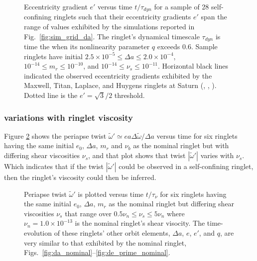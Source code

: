 \documentclass[preprint]{aastex62}
\begin{document}
\begin{figure}
    \caption{
        \label{fig:e_prime_q_vs_time}
        Eccentricity gradient $e'$ versus time $t/\tau_{dyn}$ for a sample of 28 self-confining
        ringlets such that their eccentricity gradients $e'$ span the range of values
        exhibited by the simulations reported in Fig.\ \ref{fig:sim_grid_da}. 
        The ringlet's dynamical timescale $\tau_{dyn}$ is time the when its nonlinearity parameter $q$ exceeds $0.6$.
        Sample ringlets have initial $2.5\times10^{-5}\le\Delta a\le2.0\times10^{-4}$,
        $10^{-14}\le m_r\le10^{-10}$, and $10^{-14}\le \nu_s\le10^{-11}$.
        Horizontal black lines indicated the observed eccentricity gradients 
        exhibited by the Maxwell, Titan, Laplace, and Huygens ringlets at Saturn 
        (\citealt{Netal14}, \citealt{Fetal16}, \citealt{SH16}). Dotted line is the $e'=\sqrt{3}/2$ threshold.
    }
\end{figure}


\subsubsection{variations with ringlet viscosity}
\label{subsec:viscosity-variations}

Figure \ref{fig:wt_prime_vs_time} shows the periapse twist $\tilde{\omega}' \simeq ea\Delta\tilde{\omega}/\Delta a$ 
versus time for six ringlets
having the same initial $e_0$, $\Delta a$, $m_r$ and $\nu_b$ as the nominal ringlet but with differing shear
viscosities $\nu_s$, and that plot shows that twist $|\tilde{\omega}'|$ varies with $\nu_s$. Which indicates that if 
the twist $|\tilde{\omega}'|$ could be observed in a self-confining ringlet, then 
the ringlet's viscosity could then be inferred. 

\begin{figure}
    \caption{
        \label{fig:wt_prime_vs_time}
        Periapse twist $\tilde{\omega}'$ is plotted versus time $t/\tau_\nu$ for six ringlets
        having the same initial $e_0$, $\Delta a$, $m_r$ as the nominal ringlet
        but differing shear viscosities $\nu_s$ that range over $0.5\nu_n\le\nu_s\le5\nu_n$
        where $\nu_n=1.0\times10^{-13}$ is the nominal ringlet's shear visocity.
        The time-evolution of these ringlets' other orbit elements,  $\Delta a$, $e$, $e'$, and $q$,
        are very similar to that exhibited by the nominal ringlet, 
        Figs.\ \ref{fig:da_nominal}--\ref{fig:de_prime_nominal}. 
    }
\end{figure}
\end{document}
